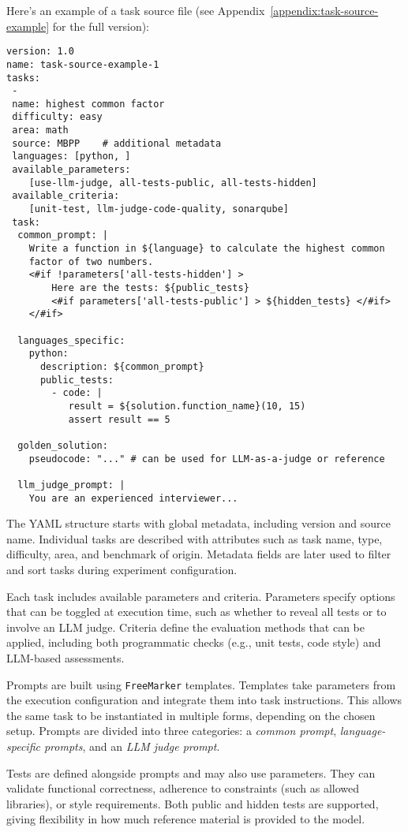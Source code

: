 Here's an example of a task source file (see Appendix~\ref{appendix:task-source-example} for the full version):

\begin{verbatim}
version: 1.0
name: task-source-example-1
tasks:
 -
 name: highest common factor
 difficulty: easy
 area: math
 source: MBPP    # additional metadata
 languages: [python, ]
 available_parameters:
    [use-llm-judge, all-tests-public, all-tests-hidden]
 available_criteria:
    [unit-test, llm-judge-code-quality, sonarqube]
 task:
  common_prompt: |
    Write a function in ${language} to calculate the highest common
    factor of two numbers.
    <#if !parameters['all-tests-hidden'] >
        Here are the tests: ${public_tests}
        <#if parameters['all-tests-public'] > ${hidden_tests} </#if>
    </#if>

  languages_specific:
    python:
      description: ${common_prompt}
      public_tests:
        - code: |
           result = ${solution.function_name}(10, 15)
           assert result == 5

  golden_solution:
    pseudocode: "..." # can be used for LLM-as-a-judge or reference

  llm_judge_prompt: |
    You are an experienced interviewer...
\end{verbatim}

The YAML structure starts with global metadata, including version and source name.
Individual tasks are described with attributes such as task name, type, difficulty, area, and benchmark of origin.
Metadata fields are later used to filter and sort tasks during experiment configuration.

Each task includes available parameters and criteria.
Parameters specify options that can be toggled at execution time, such as whether to reveal all tests or to involve an LLM judge.
Criteria define the evaluation methods that can be applied, including both programmatic checks (e.g., unit tests, code style) and LLM-based assessments.

Prompts are built using \texttt{FreeMarker} templates. Templates take parameters from the execution configuration and integrate them into task instructions.
This allows the same task to be instantiated in multiple forms, depending on the chosen setup.
Prompts are divided into three categories: a \emph{common prompt}, \emph{language-specific prompts}, and an \emph{LLM judge prompt}.

Tests are defined alongside prompts and may also use parameters.
They can validate functional correctness, adherence to constraints (such as allowed libraries), or style requirements.
Both public and hidden tests are supported, giving flexibility in how much reference material is provided to the model.


